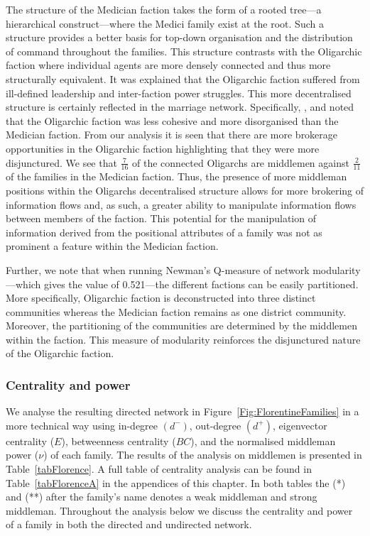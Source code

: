 \documentclass[11pt,fleqn]{article}
\begin{document}
The structure of the Medician faction takes the form of a rooted tree---a hierarchical construct---where the Medici family exist at the root. Such a structure provides a better basis for top-down organisation and the distribution of command throughout the families. This structure contrasts with the Oligarchic faction where individual agents are more densely connected and thus more structurally equivalent. It was explained that the Oligarchic faction suffered from ill-defined leadership and inter-faction power struggles. This more decentralised structure is certainly reflected in the marriage network. Specifically, \citet{Padgett1993}, \citet{PadgettMcLean2006} and \citet{PadgettPowell2012} noted that the Oligarchic faction was less cohesive and more disorganised than the Medician faction. From our analysis it is seen that there are more brokerage opportunities in the Oligarchic faction highlighting that they were more disjunctured. We see that $\tfrac{7}{16}$ of the connected Oligarchs are middlemen against $\tfrac{2}{11}$ of the families in the Medician faction. Thus, the presence of more middleman positions within the Oligarchs decentralised structure allows for more brokering of information flows and, as such, a greater ability to manipulate information flows between members of the faction. This potential for the manipulation of information derived from the positional attributes of a family was not as prominent a feature within the Medician faction.

Further, we note that when running Newman's Q-measure of network modularity \citep{Newman2004detecting, Newman2006}---which gives the value of 0.521---the different factions can be easily partitioned. More specifically, Oligarchic faction is deconstructed into three distinct communities whereas the Medician faction remains as one district community. Moreover, the partitioning of the communities are determined by the middlemen within the faction. This measure of modularity reinforces the disjunctured nature of the Oligarchic faction.

\subsubsection{Centrality and power}

We analyse the resulting directed network in Figure~\ref{Fig:FlorentineFamilies} in a more technical way using in-degree $\left(d^-\right)$, out-degree $\left(d^+\right)$, \citet{Bonacich1987} eigenvector centrality ($E$), betweenness centrality ($BC$), and the normalised middleman power ($\nu$) of each family. The results of the analysis on middlemen is presented in Table~\ref{tabFlorence}. A full table of centrality analysis can be found in Table~\ref{tabFlorenceA} in the appendices of this chapter. In both tables the (*) and (**) after the family's name denotes a weak middleman and strong middleman. Throughout the analysis below we discuss the centrality and power of a family in both the directed and undirected network.
\end{document}
